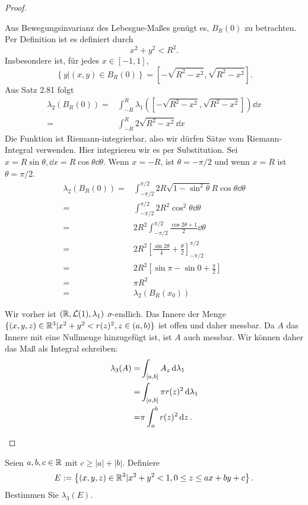 \begin{proof}
	\begin{parts}
	\item Aus Bewegungsinvarianz des Lebesgue-Maßes genügt es, $B_R(0)$ zu betrachten. Per Definition ist es definiert durch
		\[
		x^2+y^2<R^2
		.\]
		Insbesondere ist, f\"{u}r jedes $x\in [-1,1]$, 
			\[
				\left\{ y|(x,y)\in B_R(0) \right\} =[-\sqrt{R^2-x^2} ,\sqrt{R^2-x^2}] 
			.\] 
			Aus Satz 2.81 folgt
			\begin{align*}
				\lambda_2(B_R(0))=&\int_{-R}^R \lambda_1([-\sqrt{R^2-x^2} ,\sqrt{R^2-x^2} ])\dd{x}\\
				=&\int_{-R}^R 2\sqrt{R^2-x^2} \dd{x}
			\end{align*}
			Die Funktion ist Riemann-integrierbar, also wir dürfen Sätze vom Riemann-Integral verwenden. Hier integrieren wir es per Substitution. Sei $x=R\sin\theta,\dd{x}=R\cos\theta\dd{\theta}$. Wenn $x=-R$, ist $\theta=-\pi / 2$ und wenn $x=R$ ist $\theta=\pi / 2$. 
			\begin{align*}
				\lambda_2(B_R(0))=&\int_{-\pi / 2}^{\pi / 2} 2R\sqrt{1-\sin^2\theta} R\cos\theta\dd{\theta}\\
				=&\int_{-\pi / 2}^{\pi / 2}2R^2\cos^2\theta\dd{\theta}\\
				=&2R^2\int_{-\pi / 2}^{\pi / 2}\frac{\cos 2\theta+1}{2}\dd{\theta}\\
				=&2R^2\left[ \frac{\sin 2\theta}{4}+\frac{\theta}{2} \right]_{-\pi / 2}^{\pi /2}\\
				=&2R^2\left[ \sin \pi - \sin 0 + \frac{\pi}{2} \right] \\
				=&\pi R^2\\
				=&\lambda_2(B_R(x_0))
			\end{align*}
		\item Wir vorher ist $(\mathbb{R}, \mathcal{L}(1), \lambda_1)$ $\sigma$-endlich. Das Innere der Menge $\{ (x,y,z)\in \mathbb{R}^3|x^2+ y^2<r(z)^2,z\in (a,b) \} $ ist offen und daher messbar. Da $A$ das Innere mit eine Nullmenge hinzugefügt ist, ist $A$ auch messbar. Wir können daher das Maß als Integral schreiben:
			\begin{align*}
				\lambda_3(A)=&\int_{[a,b]} A_z\dd{\lambda_1}\\
				=&\int_{[a,b]} \pi r(z)^2\dd{\lambda_1}\\
				=&\pi \int_a^b r(z)^2\dd{z}.\qedhere
			\end{align*}
	\end{parts}
\end{proof}
\begin{Problem}
	Seien $a,b,c\in \mathbb{R}$ mit $c\ge |a|+|b|$. Definiere
	\[
	E:=\left\{ (x,y,z)\in \mathbb{R}^3|x^2+y^2<1,0\le z\le ax+by+c \right\} 
	.\] 
	Bestimmen Sie $\lambda_3(E)$.
\end{Problem}
